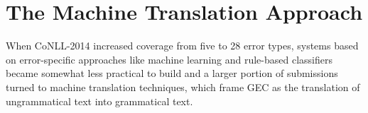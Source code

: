 


\section{The Machine Translation Approach}
When CoNLL-2014 increased coverage from five to 28 error types, systems based on error-specific approaches like machine learning and rule-based classifiers became somewhat less practical to build and a larger portion of submissions turned to machine translation techniques, which frame GEC as the translation of ungrammatical text into grammatical text.

